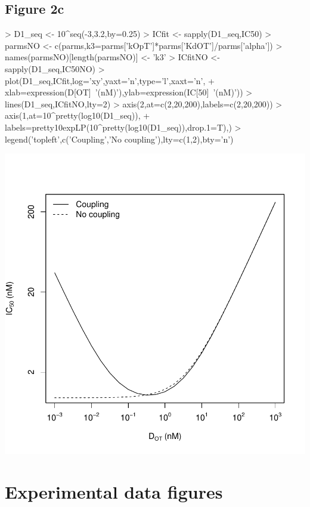 \documentclass{article}
\begin{document}
\subsection*{Figure 2c}
\begin{Schunk}
\begin{Sinput}
> D1_seq <- 10^seq(-3,3.2,by=0.25)
> ICfit <- sapply(D1_seq,IC50)
> parmsNO <- c(parms,k3=parms['kOpT']*parms['KdOT']/parms['alpha'])
> names(parmsNO)[length(parmsNO)] <- 'k3'
> ICfitNO <- sapply(D1_seq,IC50NO)
> plot(D1_seq,ICfit,log='xy',yaxt='n',type='l',xaxt='n',
+      xlab=expression(D[OT]~'(nM)'),ylab=expression(IC[50]~'(nM)'))
> lines(D1_seq,ICfitNO,lty=2)
> axis(2,at=c(2,20,200),labels=c(2,20,200))
> axis(1,at=10^pretty(log10(D1_seq)),
+      labels=pretty10expLP(10^pretty(log10(D1_seq)),drop.1=T),)
> legend('topleft',c('Coupling','No coupling'),lty=c(1,2),bty='n')
\end{Sinput}
\end{Schunk}
\includegraphics{Vignette2-008}

\section*{Experimental data figures}
\end{document}
